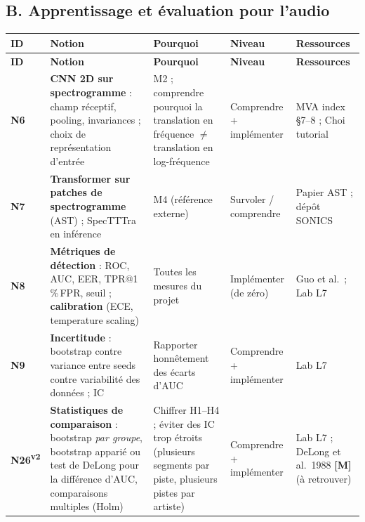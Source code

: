 \documentclass[11pt,a4paper]{article}
\newcommand{\vtwo}{\textsuperscript{\textcolor{orange!80!black}{\textbf{v2}}}}
\newcommand{\lM}{\textbf{\textcolor{red!70!black}{[M]}}}
\begin{document}
\subsection{B. Apprentissage et évaluation pour l'audio}
{\footnotesize
\begin{longtable}{L{0.95cm}L{4.1cm}L{4.6cm}L{2.2cm}L{3.3cm}}
\toprule
\textbf{ID} & \textbf{Notion} & \textbf{Pourquoi} & \textbf{Niveau} & \textbf{Ressources}\\
\midrule
\endfirsthead
\toprule
\textbf{ID} & \textbf{Notion} & \textbf{Pourquoi} & \textbf{Niveau} & \textbf{Ressources}\\
\midrule
\endhead
\bottomrule
\endfoot
\textbf{N6} & \textbf{CNN 2D sur spectrogramme} : champ réceptif, pooling, invariances ; choix de représentation d'entrée & M2 ; comprendre pourquoi la translation en fréquence $\neq$ translation en log-fréquence & Comprendre + implémenter & MVA index §7--8 ; Choi tutorial\\
\addlinespace
\textbf{N7} & \textbf{Transformer sur patches de spectrogramme} (AST) ; SpecTTTra en inférence & M4 (référence externe) & Survoler / comprendre & Papier AST ; dépôt SONICS\\
\addlinespace
\textbf{N8} & \textbf{Métriques de détection} : ROC, AUC, EER, TPR@1\,\%\,FPR, seuil ; \textbf{calibration} (ECE, temperature scaling) & Toutes les mesures du projet & Implémenter (de zéro) & Guo et al.\ ; Lab L7\\
\addlinespace
\textbf{N9} & \textbf{Incertitude} : bootstrap contre variance entre seeds contre variabilité des données ; IC & Rapporter honnêtement des écarts d'AUC & Comprendre + implémenter & Lab L7\\
\addlinespace
\textbf{N26}\vtwo & \textbf{Statistiques de comparaison} : bootstrap \emph{par groupe}, bootstrap apparié ou test de DeLong pour la différence d'AUC, comparaisons multiples (Holm) & Chiffrer H1--H4 ; éviter des IC trop étroits (plusieurs segments par piste, plusieurs pistes par artiste) & Comprendre + implémenter & Lab L7 ; DeLong et al.\ 1988 \lM{} (à retrouver)\\
\end{longtable}}
\end{document}
